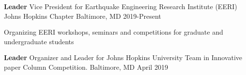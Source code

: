 \begin{cventries}
  \cventry
    {\textbf{Leader}} %
    {Vice President for Earthquake Engineering Research Institute (EERI) Johns Hopkins Chapter} %
    {Baltimore, MD} %
    {2019-Present} %
    {
      \begin{cvitems} %
        \item {Organizing EERI workshops, seminars and competitions for graduate and undergraduate students}
      \end{cvitems}
    }
  \cventry
    {\textbf{Leader}} %
    {Organizer and Leader for Johns Hopkins University Team in Innovative paper Column Competition.} %
    {Baltimore, MD} %
    {April 2019} %
   {
}
\end{cventries}
